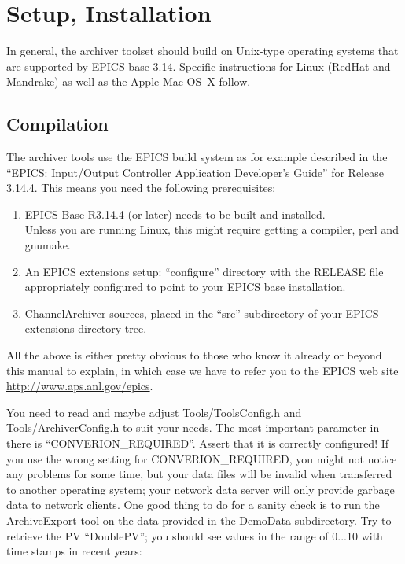\chapter{Setup, Installation} \label{sec:install}
In general, the archiver toolset should build on Unix-type operating
systems that are supported by EPICS base 3.14.
Specific instructions for Linux (RedHat and Mandrake) as well as the Apple
Mac OS~X follow.

\section{Compilation}
The archiver tools use the EPICS build system as for example described
in the ``EPICS: Input/Output Controller Application Developer's
Guide'' for Release 3.14.4.  This means you need the following
prerequisites:
\begin{enumerate}
\item EPICS Base R3.14.4 (or later) needs to be built and installed.\\
      Unless you are running Linux, this might require getting a
      compiler, perl and gnumake.
\item An EPICS extensions setup: ``configure'' directory with the RELEASE
      file appropriately configured to point to your EPICS base installation.
\item ChannelArchiver sources, placed in the ``src'' subdirectory of
      your EPICS extensions directory tree. 
\end{enumerate}

\noindent All the above is either pretty obvious to those who know it
already or beyond this manual to explain, in which case we have to
refer you to the EPICS web site
\href{http://www.aps.anl.gov/epics}{http://www.aps.anl.gov/epics}. 

You need to read and maybe adjust Tools/ToolsConfig.h and
Tools/ArchiverConfig.h to suit your needs. The most important
parameter in there is ``CONVERION\_REQUIRED''. Assert that it is
correctly configured! If you use the wrong setting for
CONVERION\_REQUIRED, you might not notice any problems for some time,
but your data files will be invalid when transferred to another
operating system; your network data server will only provide garbage
data to network clients.  One good thing to do for a sanity check is
to run the ArchiveExport tool on the data provided in the DemoData
subdirectory. Try to retrieve the PV ``DoublePV''; you should see
values in the range of 0...10 with time stamps in recent years:

